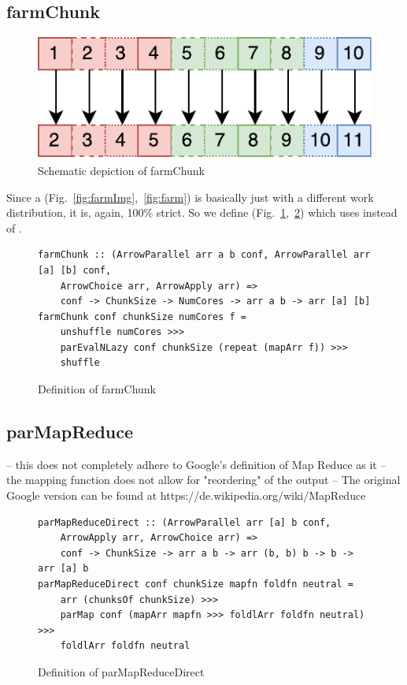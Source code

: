\subsection{farmChunk}
\begin{figure}[h]
	\includegraphics[scale=0.7]{images/farmChunk}
\caption{Schematic depiction of farmChunk}
\label{fig:farmChunkImg}
\end{figure}
Since a  (Fig.~\ref{fig:farmImg},~\ref{fig:farm}) is basically just  with a different work distribution, it is, again, 100\% strict. So we define  (Fig.~\ref{fig:farmChunkImg},~\ref{fig:farmChunk}) which uses  instead of .
\begin{figure}[h]
\begin{lstlisting}[frame=htrbl]
farmChunk :: (ArrowParallel arr a b conf, ArrowParallel arr [a] [b] conf,
	ArrowChoice arr, ArrowApply arr) =>
	conf -> ChunkSize -> NumCores -> arr a b -> arr [a] [b]
farmChunk conf chunkSize numCores f =
	unshuffle numCores >>>
	parEvalNLazy conf chunkSize (repeat (mapArr f)) >>>
	shuffle
\end{lstlisting}
\caption{Definition of farmChunk}
\label{fig:farmChunk}
\end{figure}

\subsection{parMapReduce}


-- this does not completely adhere to Google's definition of Map Reduce as it
-- the mapping function does not allow for "reordering" of the output
-- The original Google version can be found at https://de.wikipedia.org/wiki/MapReduce

\begin{figure}[h]
\begin{lstlisting}[frame=htrbl]
parMapReduceDirect :: (ArrowParallel arr [a] b conf,
	ArrowApply arr, ArrowChoice arr) =>
	conf -> ChunkSize -> arr a b -> arr (b, b) b -> b -> arr [a] b
parMapReduceDirect conf chunkSize mapfn foldfn neutral =
	arr (chunksOf chunkSize) >>>
	parMap conf (mapArr mapfn >>> foldlArr foldfn neutral) >>>
	foldlArr foldfn neutral
\end{lstlisting}
\caption{Definition of parMapReduceDirect}
\label{fig:parMapReduceDirect}
\end{figure}


